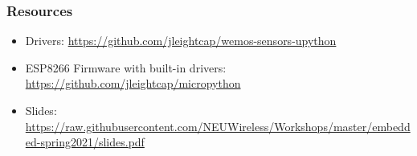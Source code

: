 \documentclass{beamer} \usetheme{Madrid}
\begin{document}
\begin{frame}
	\frametitle{Resources}
	\begin{itemize}
		\item Drivers: \url{https://github.com/jleightcap/wemos-sensors-upython}
		\item ESP8266 Firmware with built-in drivers: \url{https://github.com/jleightcap/micropython}
		\item Slides:
		      \url{https://raw.githubusercontent.com/NEUWireless/Workshops/master/embedded-spring2021/slides.pdf}
	\end{itemize}
\end{frame}
\end{document}
